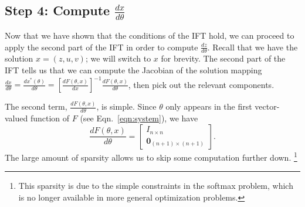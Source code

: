 \documentclass[11pt]{article}
\begin{document}
\subsection*{Step 4: Compute $\frac{dx}{d\theta}$}
Now that we have shown that the conditions of the IFT hold,
we can proceed to apply the second part of the IFT in order to compute $\frac{dz}{d\theta}$.
Recall that we have the solution $x = (z,u,v)$; we will switch to $x$ for brevity.
The second part of the IFT tells us that we can compute the Jacobian of the
solution mapping $\frac{dx}{d\theta} = \frac{dx^*(\theta)}{d\theta}
= \left[\frac{dF(\theta,x)}{dx}\right]^{-1}\frac{dF(\theta,x)}{d\theta}$,
then pick out the relevant components.

The second term, $\frac{dF(\theta,x)}{d\theta}$, is simple.
Since $\theta$ only appears in the first vector-valued function of $F$
(see Eqn.~\ref{eqn:system}), we have
\begin{equation}
\label{eqn:df-dtheta}
\frac{dF(\theta,x)}{d\theta} = \begin{bmatrix}
    I_{n\times n}\\
    \mathbf{0}_{(n+1)\times (n+1)}
\end{bmatrix}.
\end{equation}
The large amount of sparsity allows us to skip some computation further down.
\footnote{This sparsity is due to the simple constraints in the softmax problem,
which is no longer available in more general optimization problems.}
\end{document}
